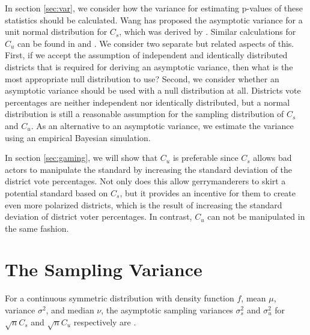 \documentclass[preprint,12pt]{article}
\begin{document}
In section \ref{sec:var}, we consider how the variance for estimating p-values of these statistics should be calculated.
Wang has proposed the asymptotic variance for a unit normal distribution for $C_{s}$, which was derived by \cite{Cabilio_1996_10.2307/3315744}.
Similar calculations for $C_{u}$ can be found in \cite{Cabilio_1996_10.2307/3315744} and \cite{Mira_1999_10.1080/02664769921963}.
We consider two separate but related aspects of this.
First, if we accept the assumption of independent and identically distributed districts that is required for deriving an asymptotic variance, then what is the most appropriate null distribution to use?
Second, we consider whether an asymptotic variance should be used with a null distribution at all.
Districts vote percentages are neither independent nor identically distributed, but a normal distribution is still a reasonable assumption for the sampling distribution of $C_{s}$ and $C_{u}$.
As an alternative to an asymptotic variance, we estimate the variance using an empirical Bayesian simulation.

In section \ref{sec:gaming}, we will show that $C_{u}$ is preferable since $C_{s}$ allows bad actors to manipulate the standard by increasing the standard deviation of the district vote percentages.
Not only does this allow gerrymanderers to skirt a potential standard based on $C_{s}$, but it provides an incentive for them to create even more polarized districts, which is the result of increasing the standard deviation of district voter percentages.
In contrast, $C_{u}$ can not be manipulated in the same fashion.


\section{The Sampling Variance\label{sec:var}}

For a continuous symmetric distribution with density function $f$, mean $\mu$, variance $\sigma^{2}$, and median $\nu$, the asymptotic sampling variances $\sigma^{2}_{s}$ and $\sigma^{2}_{u}$ for $\sqrt{n}C_{s}$ and $\sqrt{n}C_{u}$ respectively are \cite{Cabilio_1996_10.2307/3315744,Mira_1999_10.1080/02664769921963}.
\end{document}
